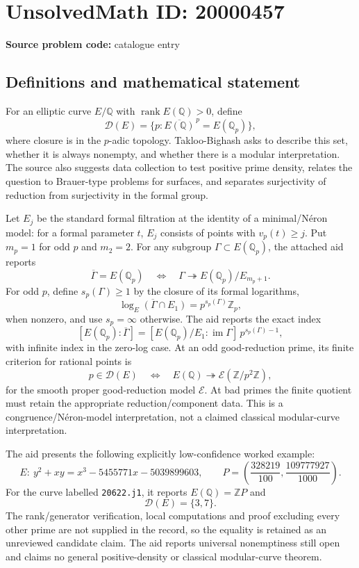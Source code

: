 \documentclass[11pt]{article}
\newcommand{\Z}{\mathbb{Z}}
\newcommand{\Q}{\mathbb{Q}}
\begin{document}
\section*{UnsolvedMath ID: 20000457}
\textbf{Source problem code:} catalogue entry
\subsection{Definitions and mathematical statement}
For an elliptic curve \(E/\Q\) with \(\operatorname{rank}E(\Q)>0\), define
\[
\mathcal D(E)=\{p:\overline{E(\Q)}^{\,p}=E(\Q_p)\},
\]
where closure is in the \(p\)-adic topology. Takloo-Bighash asks to describe this set, whether it is always nonempty, and whether there is a modular interpretation. The source also suggests data collection to test positive prime density, relates the question to Brauer-type problems for surfaces, and separates surjectivity of reduction from surjectivity in the formal group.

Let \(E_j\) be the standard formal filtration at the identity of a minimal/N\'eron model: for a formal parameter \(t\), \(E_j\) consists of points with \(v_p(t)\geq j\). Put \(m_p=1\) for odd \(p\) and \(m_2=2\). For any subgroup \(\Gamma\subset E(\Q_p)\), the attached aid reports
\[
\overline\Gamma=E(\Q_p)
\quad\Longleftrightarrow\quad
\Gamma\twoheadrightarrow E(\Q_p)/E_{m_p+1}.
\]
For odd \(p\), define \(s_p(\Gamma)\geq1\) by the closure of its formal logarithms,
\[
\overline{\log_E(\Gamma\cap E_1)}=p^{s_p(\Gamma)}\Z_p,
\]
when nonzero, and use \(s_p=\infty\) otherwise. The aid reports the exact index
\[
[E(\Q_p):\overline\Gamma]
=[E(\Q_p)/E_1:\operatorname{im}\Gamma]\,p^{s_p(\Gamma)-1},
\]
with infinite index in the zero-log case. At an odd good-reduction prime, its finite criterion for rational points is
\[
p\in\mathcal D(E)\quad\Longleftrightarrow\quad
E(\Q)\twoheadrightarrow\mathcal E(\Z/p^2\Z),
\]
for the smooth proper good-reduction model \(\mathcal E\). At bad primes the finite quotient must retain the appropriate reduction/component data. This is a congruence/N\'eron-model interpretation, not a claimed classical modular-curve interpretation.

The aid presents the following explicitly low-confidence worked example:
\[
E:\ y^2+xy=x^3-5455771x-5039899603,
\qquad P=\left(\frac{328219}{100},\frac{109777927}{1000}\right).
\]
For the curve labelled \texttt{20622.j1}, it reports \(E(\Q)=\Z P\) and
\[
\mathcal D(E)=\{3,7\}.
\]
The rank/generator verification, local computations and proof excluding every other prime are not supplied in the record, so the equality is retained as an unreviewed candidate claim. The aid reports universal nonemptiness still open and claims no general positive-density or classical modular-curve theorem.
\end{document}
